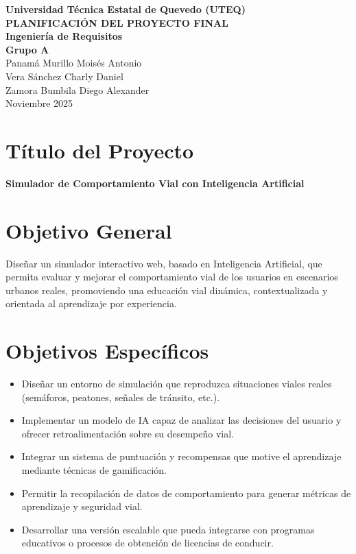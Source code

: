 \documentclass[12pt]{article}
\begin{document}
\begin{center}
\textbf{Universidad Técnica Estatal de Quevedo (UTEQ)}\\[1em]

\textbf{PLANIFICACIÓN DEL PROYECTO FINAL}\\[1em]

\textbf{Ingeniería de Requisitos}\\[1em]

\textbf{Grupo A}\\[2em]

Panamá Murillo Moisés Antonio\\
Vera Sánchez Charly Daniel\\
Zamora Bumbila Diego Alexander\\[2em]

Noviembre 2025
\end{center}

\newpage
\tableofcontents
\newpage

\section{Título del Proyecto}
\textbf {Simulador de Comportamiento Vial con Inteligencia Artificial}

\section{Objetivo General}
Diseñar un simulador interactivo web, basado en Inteligencia Artificial, que permita evaluar y mejorar el comportamiento vial de los usuarios en escenarios urbanos reales, promoviendo una educación vial dinámica, contextualizada y orientada al aprendizaje por experiencia.

\section{Objetivos Específicos}
\begin{itemize}
    \item Diseñar un entorno de simulación que reproduzca situaciones viales reales (semáforos, peatones, señales de tránsito, etc.).
    \item Implementar un modelo de IA capaz de analizar las decisiones del usuario y ofrecer retroalimentación sobre su desempeño vial.
    \item Integrar un sistema de puntuación y recompensas que motive el aprendizaje mediante técnicas de gamificación.
    \item Permitir la recopilación de datos de comportamiento para generar métricas de aprendizaje y seguridad vial.
    \item Desarrollar una versión escalable que pueda integrarse con programas educativos o procesos de obtención de licencias de conducir.
\end{itemize}
\end{document}
